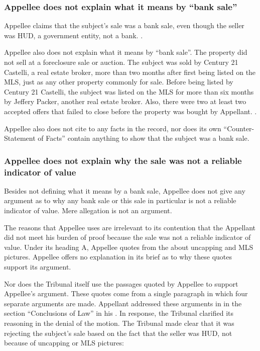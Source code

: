 \documentclass[12pt,\documentclassflag]{michiganCourtOfAppealsBrief}
\begin{document}
\subsubsection{Appellee does not explain what it means by ``bank sale''}

Appellee claims that the subject's sale was a bank sale, even though the seller was HUD, a government entity, not a bank. \mlsListing.

Appellee also does not explain what it means by ``bank sale''. The property did not sell at a foreclosure sale or auction. The subject was sold by Century 21 Castelli, a real estate broker, more than two months after first being listed on the MLS, just as any other property commonly for sale. Before being listed by Century 21 Castelli, the subject was listed on the MLS for more than six months by Jeffery Packer, another real estate broker. Also, there were two at least two accepted offers that failed to close before the property was bought by Appellant. \mlsHistory.

Appellee also does not cite to any facts in the record, nor does its own ``Counter-Statement of Facts'' contain anything to show that the subject was a bank sale.

\subsubsection{Appellee does not explain why the sale was not a reliable indicator of value}

Besides not defining what it means by a bank sale, Appellee does not give any argument as to why any bank sale or this sale in particular is not a reliable indicator of value. Mere allegation is not an argument. 

The reasons that Appellee uses are irrelevant to its contention that the Appellant did not meet his burden of proof because the sale was not a reliable indicator of value. Under its heading A, Appellee quotes from the \foj[5] about uncapping and MLS pictures. Appellee offers no explanation in its brief as to why these quotes support its argument.

Nor does the Tribunal itself use the passages quoted by Appellee to support Appellee's argument. These quotes come from a single paragraph in which four separate arguments are made.
Appellant addressed these arguments in in the section ``Conclusions of Law'' in his \motionForReconsideration[4-5].
In response, the Tribunal clarified its reasoning in the denial of the motion. The Tribunal made clear that it was rejecting the subject's sale based on the fact that the seller was HUD, not because of uncapping or MLS pictures:
\end{document}
